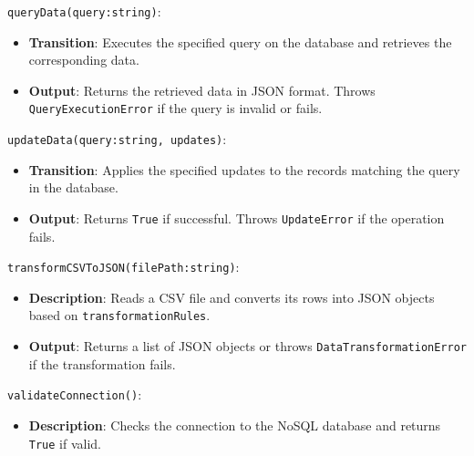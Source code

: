 \documentclass[12pt, titlepage]{article}
\begin{document}
\begin{description}
\begin{description}
\texttt{queryData(query:string)}:
  \item
  \begin{itemize}
    \item \textbf{Transition}: Executes the specified query on the database and retrieves the
    corresponding data.
  \end{itemize}
  \item 
  \begin{itemize}
    \item \textbf{Output}: Returns the retrieved data in JSON format. Throws \texttt{QueryExecutionError}
    if the query is invalid or fails.
  \end{itemize}
  \item

\texttt{updateData(query:string, updates)}:
  \item
  \begin{itemize}
    \item \textbf{Transition}: Applies the specified updates to the records matching the query
    in the database.
  \end{itemize}
  \item
  \begin{itemize}
    \item \textbf{Output}: Returns \texttt{True} if successful. Throws \texttt{UpdateError}
    if the operation fails.
  \end{itemize}
  \item

  \item[Local Function:] 
  \item
\texttt{transformCSVToJSON(filePath:string)}:
  \item
  \begin{itemize}
    \item \textbf{Description}: Reads a CSV file and converts its rows into JSON objects based on
    \texttt{transformationRules}.
  \end{itemize}
  \item 
  \begin{itemize}
    \item \textbf{Output}: Returns a list of JSON objects or throws \texttt{DataTransformationError}
    if the transformation fails.
  \end{itemize}
  \item 
  \texttt{validateConnection()}:
  \item 
  \begin{itemize}
    \item \textbf{Description}: Checks the connection to the NoSQL database and returns \texttt{True}
    if valid.
  \end{itemize}
\end{description}


\end{description}
\end{document}
